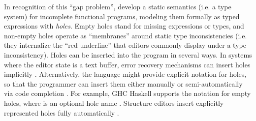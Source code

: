 In recognition of this ``{gap problem}'', \citet{popl-paper} develop a static semantics (i.e. a type system) for incomplete 
functional programs, modeling them formally as typed expressions with \emph{holes}. 
Empty holes stand for missing expressions or types,
and non-empty holes operate as ``membranes'' around static type inconsistencies 
(i.e. they internalize the ``red underline'' that editors commonly display under a type inconsistency).
Holes can be inserted into the program in several ways.
In systems where the editor state is a text buffer, error recovery mechanisms can insert holes implicitly \cite{DBLP:journals/siamcomp/AhoP72,charles1991practical,DBLP:conf/oopsla/KatsJNV09}. 
Alternatively, the language might provide explicit notation for holes, so that the programmer can insert them either manually  
or semi-automatically via code completion \cite{Amorim2016}. For example, GHC Haskell supports the notation  for empty holes, where  is an optional hole name \cite{GHCHoles}. Structure editors insert explicitly represented holes fully automatically \cite{popl-paper}.

